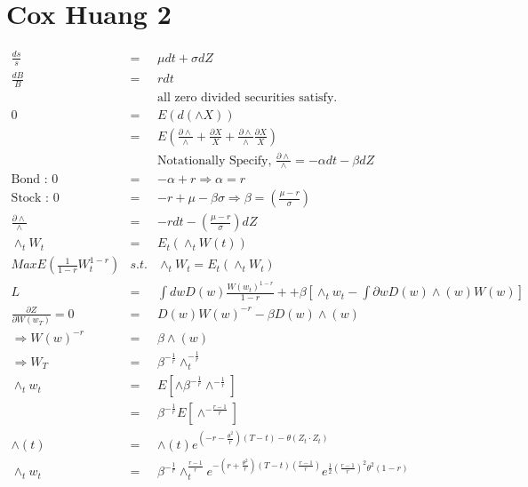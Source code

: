 \documentclass[]{article}
\begin{document}
\section*{Cox Huang 2}
\begin{eqnarray*}
\frac{ds}{s} &=& \mu dt + \sigma dZ\\
\frac{dB}{B} &=& r dt\\
&& \mbox{all zero divided securities satisfy.}\\
0 &=& E \left( d(\wedge X) \right)\\
&=& E \left( \frac{\partial \wedge}{\wedge} + \frac{\partial X}{X} + \frac{\partial \wedge}{\wedge} \frac{\partial X}{X} \right)\\
&& \mbox{Notationally Specify, } \frac{\partial \wedge}{\wedge} = - \alpha dt - \beta dZ\\
\mbox{Bond : } 0 &=& -\alpha + r \Rightarrow \alpha = r\\
\mbox{Stock : } 0 &=& -r + \mu - \beta \sigma \Rightarrow \beta = \left( \frac{\mu -r}{\sigma}\right)\\
\frac{\partial \wedge}{\wedge} &=& -r dt - \left( \frac{\mu -r}{\sigma}\right) dZ\\
\wedge _t W_t &=& E_t \left( \wedge _t W(t)\right)\\
Max E\left( \frac{1}{1-r} W_t ^{1-r}\right) &s.t.& \wedge _t W_t = E_t \left( \wedge _t W_t\right)\\
L&=& \int dw D(w) \frac{W(w_t)^{1-r}}{1-r} + + \beta \left[ \wedge _t w_t - \int \partial w D(w) \wedge (w) W(w) \right]\\
\frac{\partial Z}{\partial W(w_T)} = 0 &=& D(w) W(w)^{-r} - \beta D(w) \wedge (w)\\
\Rightarrow W(w)^{-r} &=& \beta \wedge(w)\\
\Rightarrow W_T &=& \beta ^{-\frac{1}{r}} \wedge _t ^{-\frac{1}{r}}\\
\wedge _t w_t &=& E \left[ \wedge \beta ^{-\frac{1}{r}} \wedge ^{-\frac{1}{r}}\right]\\
&=& \beta ^{-\frac{1}{r}} E\left[ \wedge^{-\frac{r -1}{r}} \right]\\
\wedge(t) &=& \wedge(t) e^{\left( -r - \frac{\theta ^2}{r}\right)\left( T-t \right)-\theta \left( Z_t \cdot Z_t \right)}\\
\wedge _t w_t &=& \beta ^{-\frac{1}{r}} \wedge _t^{\frac{r-1}{r}} e^{-\left( r + \frac{\theta ^2}{r} \right)\left( T-t \right)\left( \frac{r-1}{r} \right)} e^{\frac{1}{2} \left( \frac{r-1}{r}\right)^2 \theta ^2 \left( 1-r\right)}\\

\end{eqnarray*}
\end{document}

